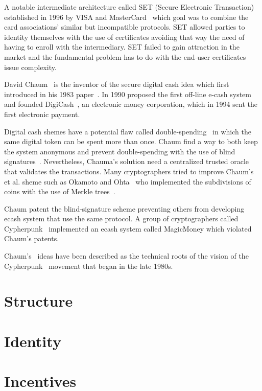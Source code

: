 A notable intermediate architecture called SET (Secure Electronic Transaction) established in 1996 by VISA and MasterCard~\cite{wiki:set}
which goal was to combine the card associations' similar but incompatible protocols. SET allowed parties to identity themselves with the use of
certificates avoiding that way the need of having to enroll with the intermediary. SET failed to gain attraction in the market and the fundamental
problem has to do with the end-user certificates issue complexity.

David Chaum~\cite{wiki:david_chaum} is the inventor of the secure digital cash idea which first introduced in his 1983 paper~\cite{Chaum1983}. In
1990 proposed the first off-line e-cash system~\cite{Chaum:1988:UEC:646753.704915} and founded DigiCash~\cite{wiki:digicash}, an electronic money corporation,
which in 1994 sent the first electronic payment.

Digital cash shemes have a potential flaw called double-spending~\cite{wiki:double_spend} in which the same digital token can be spent more than once.
Chaum find a way to both keep the system anonymous and prevent double-spending with the use of blind signatures~\cite{Chaum1983,Chaum:1988:UEC:646753.704915}.
Nevertheless, Chauma's solution need a centralized trusted oracle that validates the transactions. Many cryptographers tried to improve Chaum's et al. sheme
such as Okamoto and Ohta~\cite{Watanabe1996} who implemented the subdivisions of coins with the use of Merkle trees~\cite{wiki:merkle_tree}.

Chaum patent the blind-signature scheme preventing others from developing ecash system that use the same protocol. A group of cryptographers called
Cypherpunk~\cite{wiki:cypherpunk} implemented an ecash system called MagicMoney which violated Chaum's patents.

Chaum's~\cite{wiki:david_chaum} ideas have been described as the technical roots of the vision of the Cypherpunk~\cite{wiki:cypherpunk}
movement that began in the late 1980s.

\section{Structure}\label{blockchain:structure}

\section{Identity}\label{blockchain:identity}

\section{Incentives}\label{blockchain:incentives}

